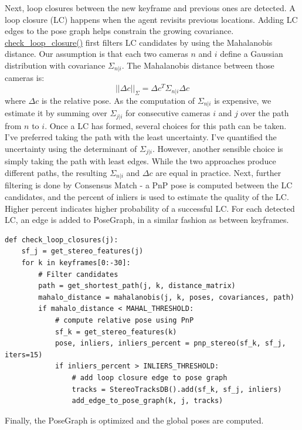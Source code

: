 \documentclass[12pt]{article}
\begin{document}
Next, loop closures between the new keyframe and previous ones are detected. A loop closure (LC) happens when the agent revisits previous locations. Adding LC edges to the pose graph helps constrain the growing covariance.  \href{https://github.com/ehud-gordon/VAN_ex/blob/master/src/stereo_slam.py#L139}{check_loop_closure()} first filters LC candidates by using the Mahalanobis distance. Our assumption is that each two cameras $n$ and $i$ define a Gaussian distribution with covariance $\Sigma_{n|i}$. The Mahalanobis distance between those cameras is: 
\[ ||\Delta c||_{\Sigma} = \Delta c^{T} \Sigma_{n|i} \Delta c \]
where $\Delta c$ is the relative pose. As the computation of $\Sigma_{n|i}$ is expensive, we estimate it by summing over $\Sigma_{j|i}$ for consecutive cameras $i$ and $j$ over the path from $n$ to $i$. Once a LC has formed, several choices for this path can be taken. I've preferred taking the path with the least uncertainty. I've quantified the uncertainty using the determinant of $\Sigma_{j|i}$. However, another sensible choice is simply taking the path with least edges. While the two approaches produce different paths, the resulting $\Sigma_{n|i}$ and $\Delta c$ are equal in practice. Next, further filtering is done by Consensus Match - a PnP pose is computed between the LC candidates, and the percent of inliers is used to estimate the quality of the LC. Higher percent indicates higher probability of a successful LC. For each detected LC, an edge is added to PoseGraph, in a similar fashion as between keyframes.
\begin{tcolorbox}  
\begin{verbatim}
def check_loop_closures(j):
    sf_j = get_stereo_features(j)
    for k in keyframes[0:-30]:
        # Filter candidates
        path = get_shortest_path(j, k, distance_matrix)
        mahalo_distance = mahalanobis(j, k, poses, covariances, path)
        if mahalo_distance < MAHAL_THRESHOLD:
            # compute relative pose using PnP
            sf_k = get_stereo_features(k)
            pose, inliers, inliers_percent = pnp_stereo(sf_k, sf_j, iters=15)
            if inliers_percent > INLIERS_THRESHOLD:
                # add loop closure edge to pose graph
                tracks = StereoTracksDB().add(sf_k, sf_j, inliers)
                add_edge_to_pose_graph(k, j, tracks)
\end{verbatim} 
\end{tcolorbox}
Finally, the PoseGraph is optimized and the global poses are computed.

\newpage
\end{document}
